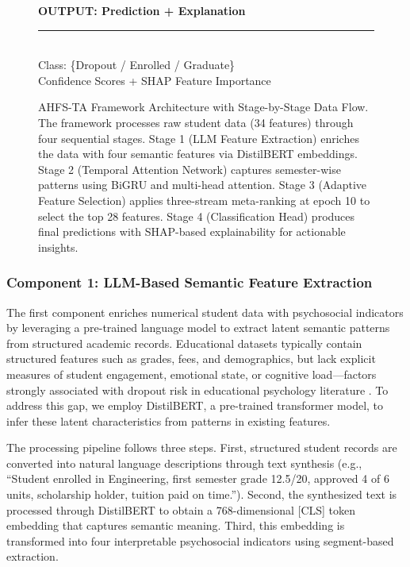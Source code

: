 \documentclass[journal]{IEEEtran}
\begin{document}
\begin{figure}[h]
{{\textbf{OUTPUT: Prediction + Explanation}\\
\rule{0.45\textwidth}{0.5pt}\\
Class: \{Dropout / Enrolled / Graduate\}\\
Confidence Scores + SHAP Feature Importance
}}
\caption{AHFS-TA Framework Architecture with Stage-by-Stage Data Flow. The framework processes raw student data (34 features) through four sequential stages. Stage 1 (LLM Feature Extraction) enriches the data with four semantic features via DistilBERT embeddings. Stage 2 (Temporal Attention Network) captures semester-wise patterns using BiGRU and multi-head attention. Stage 3 (Adaptive Feature Selection) applies three-stream meta-ranking at epoch 10 to select the top 28 features. Stage 4 (Classification Head) produces final predictions with SHAP-based explainability for actionable insights.}
\label{fig:framework}
\end{figure}

\subsubsection{Component 1: LLM-Based Semantic Feature Extraction}

The first component enriches numerical student data with psychosocial indicators by leveraging a pre-trained language model to extract latent semantic patterns from structured academic records. Educational datasets typically contain structured features such as grades, fees, and demographics, but lack explicit measures of student engagement, emotional state, or cognitive load---factors strongly associated with dropout risk in educational psychology literature \cite{breetzke2024expectancy}. To address this gap, we employ DistilBERT, a pre-trained transformer model, to infer these latent characteristics from patterns in existing features.

The processing pipeline follows three steps. First, structured student records are converted into natural language descriptions through text synthesis (e.g., ``Student enrolled in Engineering, first semester grade 12.5/20, approved 4 of 6 units, scholarship holder, tuition paid on time.''). Second, the synthesized text is processed through DistilBERT to obtain a 768-dimensional [CLS] token embedding that captures semantic meaning. Third, this embedding is transformed into four interpretable psychosocial indicators using segment-based extraction.
\end{document}
